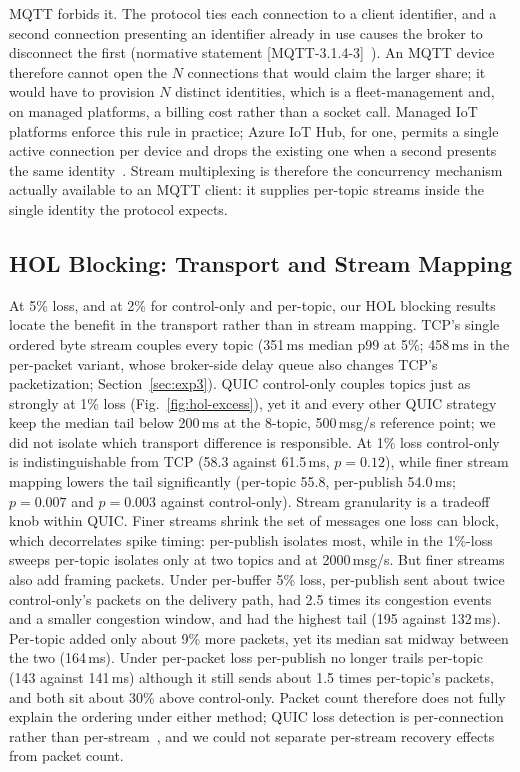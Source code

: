 \documentclass[a4paper,fleqn]{cas-dc}
\begin{document}
MQTT forbids it. The protocol ties each connection to a client identifier, and a second connection presenting an identifier already in use causes the broker to disconnect the first (normative statement \mbox{[MQTT-3.1.4-3]}~\cite{mqtt-v5-spec}). An MQTT device therefore cannot open the $N$ connections that would claim the larger share; it would have to provision $N$ distinct identities, which is a fleet-management and, on managed platforms, a billing cost rather than a socket call. Managed IoT platforms enforce this rule in practice; Azure IoT Hub, for one, permits a single active connection per device and drops the existing one when a second presents the same identity~\cite{azureiot}. Stream multiplexing is therefore the concurrency mechanism actually available to an MQTT client: it supplies per-topic streams inside the single identity the protocol expects.

\subsection{HOL Blocking: Transport and Stream Mapping}

At 5\% loss, and at 2\% for control-only and per-topic, our HOL blocking results locate the benefit in the transport rather than in stream mapping. TCP's single ordered byte stream couples every topic (351\,ms median p99 at 5\%; 458\,ms in the per-packet variant, whose broker-side delay queue also changes TCP's packetization; Section~\ref{sec:exp3}). QUIC control-only couples topics just as strongly at 1\% loss (Fig.~\ref{fig:hol-excess}), yet it and every other QUIC strategy keep the median tail below 200\,ms at the 8-topic, 500\,msg/s reference point; we did not isolate which transport difference is responsible. At 1\% loss control-only is indistinguishable from TCP (58.3 against 61.5\,ms, $p=0.12$), while finer stream mapping lowers the tail significantly (per-topic 55.8, per-publish 54.0\,ms; $p=0.007$ and $p=0.003$ against control-only). Stream granularity is a tradeoff knob within QUIC. Finer streams shrink the set of messages one loss can block, which decorrelates spike timing: per-publish isolates most, while in the 1\%-loss sweeps per-topic isolates only at two topics and at 2000\,msg/s. But finer streams also add framing packets. Under per-buffer 5\% loss, per-publish sent about twice control-only's packets on the delivery path, had 2.5 times its congestion events and a smaller congestion window, and had the highest tail (195 against 132\,ms). Per-topic added only about 9\% more packets, yet its median sat midway between the two (164\,ms). Under per-packet loss per-publish no longer trails per-topic (143 against 141\,ms) although it still sends about 1.5 times per-topic's packets, and both sit about 30\% above control-only. Packet count therefore does not fully explain the ordering under either method; QUIC loss detection is per-connection rather than per-stream~\cite{rfc9002}, and we could not separate per-stream recovery effects from packet count.
\end{document}
